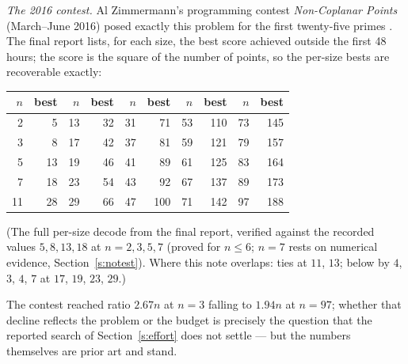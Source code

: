 \documentclass[11pt,a4paper]{article}
\begin{document}
\emph{The 2016 contest.}  Al Zimmermann's programming contest \emph{Non-Coplanar Points}
(March--June 2016) posed exactly this problem for the first twenty-five primes \cite{AZsPCs}.
The final report lists, for each size, the best score achieved outside the first 48 hours; the
score is the square of the number of points, so the per-size bests are recoverable exactly:
\begin{center}
\begin{tabular}{rr|rr|rr|rr|rr}
\toprule
$n$ & best & $n$ & best & $n$ & best & $n$ & best & $n$ & best\\
\midrule
 2 &   5 & 13 &  32 & 31 &  71 & 53 & 110 & 73 & 145\\
 3 &   8 & 17 &  42 & 37 &  81 & 59 & 121 & 79 & 157\\
 5 &  13 & 19 &  46 & 41 &  89 & 61 & 125 & 83 & 164\\
 7 &  18 & 23 &  54 & 43 &  92 & 67 & 137 & 89 & 173\\
11 &  28 & 29 &  66 & 47 & 100 & 71 & 142 & 97 & 188\\
\bottomrule
\end{tabular}

\smallskip
{\small (The full per-size decode from the final report, verified against the recorded values $5,8,13,18$
at $n=2,3,5,7$ (proved for $n\le6$; $n=7$ rests on numerical evidence, Section~\ref{s:notest}).  Where this note overlaps: ties at $11$, $13$; below by $4$, $3$, $4$, $7$ at $17$, $19$,
$23$, $29$.)}
\end{center}
The contest reached ratio $2.67n$ at $n=3$ falling to $1.94n$ at $n=97$; whether that decline
reflects the problem or the budget is precisely the question that the reported search of Section~\ref{s:effort}
does not settle --- but the numbers themselves are prior art and stand.
\end{document}
